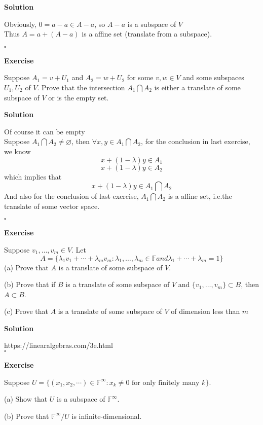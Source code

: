 \documentclass{article}
\newenvironment{exercise}{%
{\textbf{Exercise\\}
    }
}{
}
\newenvironment{solution}{%
{
    \textbf{Solution\\}
    }
}{
  \hfill $\square$ 
  \par\bigskip 
}
\newcommand{\FF}{\mathbb{F}}
\begin{document}
\begin{CJK}{UTF8}{gkai}
\begin{solution}
    Obviously, $0 = a - a \in A - a$, so $A - a$ is a subspace of $V$\\

    Thus $A = a + (A - a)$ is a affine set (translate from a subspace).
\end{solution}

\begin{exercise}
    Suppose $A_1 = v + U_1$ and $A_2 = w + U_2$ for some $v,w \in V$ and some subspaces $U_1,U_2$ of $V$. Prove that the intersection $A_1 \bigcap A_2$ is either a translate of some subspace of $V$ or is the empty set.
\end{exercise}

\begin{solution}
    Of course it can be empty\\

    Suppose $A_1\bigcap A_2 \neq \varnothing$, then $\forall x, y \in A_1\bigcap A_2$, for the conclusion in last exercise, we know
    \[x + (1 - \lambda) y \in A_1\]
    \[x + (1 - \lambda) y \in A_2\]
    which implies that 
    \[x + (1 - \lambda) y \in A_1\bigcap A_2\]
    And also for the conclusion of last exercise, $A_1 \bigcap A_2$ is a affine set, i.e.the translate of some vector space.
\end{solution}

\begin{exercise}
    Suppose $v_1,\ldots,v_m \in V$. Let 
    \[A =\{\lambda_1v_1 +\cdots+ \lambda_m v_m : \lambda_1,\ldots,\lambda_m \in \FF and \lambda_1+\cdots+ \lambda_m =1\}\]
    (a) Prove that $A$ is a translate of some subspace of $V$.
    
    (b) Prove that if $B$ is a translate of some subspace of $V$ and $\{v_1,\ldots,v_m\} \subset B$, then $A \subset B$.

    (c) Prove that $A$ is a translate of some subspace of $V$ of dimension less than $m$\\
\end{exercise}

\begin{solution}
    https://linearalgebras.com/3e.html\\
\end{solution}
\begin{exercise}
    Suppose $U = \{(x_1,x_2,\cdots) \in \FF^\infty : x_k \neq 0\text{~for only finitely many~} k\}$.

    (a) Show that $U$ is a subspace of $\FF^\infty$.
    
    (b) Prove that $\FF^\infty/U$ is infinite-dimensional.
\end{exercise}


\end{CJK}
\end{document}

